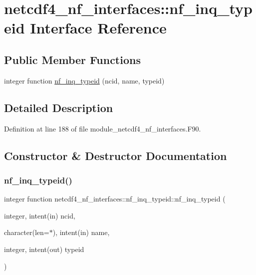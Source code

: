 \hypertarget{interfacenetcdf4__nf__interfaces_1_1nf__inq__typeid}{}\section{netcdf4\+\_\+nf\+\_\+interfaces\+:\+:nf\+\_\+inq\+\_\+typeid Interface Reference}
\label{interfacenetcdf4__nf__interfaces_1_1nf__inq__typeid}
\subsection*{Public Member Functions}
\begin{DoxyCompactItemize}
\item 
integer function \hyperlink{interfacenetcdf4__nf__interfaces_1_1nf__inq__typeid_aeedbaee32cbe43d4f3f0c632dfc89370}{nf\+\_\+inq\+\_\+typeid} (ncid, name, typeid)
\end{DoxyCompactItemize}


\subsection{Detailed Description}


Definition at line 188 of file module\+\_\+netcdf4\+\_\+nf\+\_\+interfaces.\+F90.



\subsection{Constructor \& Destructor Documentation}
\mbox{\label{interfacenetcdf4__nf__interfaces_1_1nf__inq__typeid_aeedbaee32cbe43d4f3f0c632dfc89370}} 
\subsubsection{\texorpdfstring{nf\+\_\+inq\+\_\+typeid()}{nf\_inq\_typeid()}}
{\footnotesize\ttfamily integer function netcdf4\+\_\+nf\+\_\+interfaces\+::nf\+\_\+inq\+\_\+typeid\+::nf\+\_\+inq\+\_\+typeid (\begin{DoxyParamCaption}\item[{integer, intent(in)}]{ncid,  }\item[{character(len=$\ast$), intent(in)}]{name,  }\item[{integer, intent(out)}]{typeid }\end{DoxyParamCaption})}



